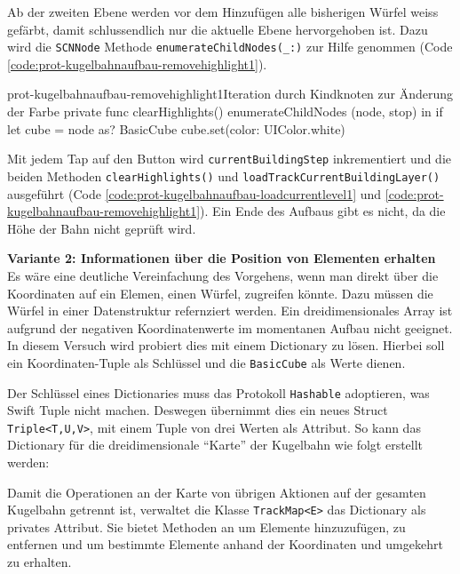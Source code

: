 \begin{description}
	Ab der zweiten Ebene werden vor dem Hinzufügen alle bisherigen Würfel weiss gefärbt, damit schlussendlich nur die aktuelle Ebene hervorgehoben ist. Dazu wird die \texttt{SCNNode} Methode \texttt{enumerateChildNodes(\_:)} zur Hilfe genommen (Code \ref{code:prot-kugelbahnaufbau-removehighlight1}).

	\begin{code}{prot-kugelbahnaufbau-removehighlight1}{Iteration durch Kindknoten zur Änderung der Farbe}
		private func clearHighlights() {
			enumerateChildNodes { (node, stop) in
				if let cube = node as? BasicCube {
					cube.set(color: UIColor.white)
				}
			}
		}
	\end{code}

	Mit jedem Tap auf den Button wird \texttt{currentBuildingStep} inkrementiert und die beiden Methoden \texttt{clearHighlights()} und \texttt{loadTrackCurrentBuildingLayer()} ausgeführt (Code \ref{code:prot-kugelbahnaufbau-loadcurrentlevel1} und \ref{code:prot-kugelbahnaufbau-removehighlight1}). Ein Ende des Aufbaus gibt es nicht, da die Höhe der Bahn nicht geprüft wird.

	\textbf{Variante 2: Informationen über die Position von Elementen erhalten}\\
	Es wäre eine deutliche Vereinfachung des Vorgehens, wenn man direkt über die Koordinaten auf ein Elemen, einen Würfel, zugreifen könnte. Dazu müssen die Würfel in einer Datenstruktur refernziert werden. Ein dreidimensionales Array ist aufgrund der negativen Koordinatenwerte im momentanen Aufbau nicht geeignet. In diesem Versuch wird probiert dies mit einem Dictionary zu lösen. Hierbei soll ein Koordinaten-Tuple als Schlüssel und die \texttt{BasicCube} als Werte dienen.
	
	Der Schlüssel eines Dictionaries muss das Protokoll \texttt{Hashable} adoptieren, was Swift Tuple nicht machen. Deswegen übernimmt dies ein neues Struct \texttt{Triple<T,U,V>}, mit einem Tuple von drei Werten als Attribut. So kann das Dictionary für die dreidimensionale "`Karte"' der Kugelbahn wie folgt erstellt werden:

	Damit die Operationen an der Karte von übrigen Aktionen auf der gesamten Kugelbahn getrennt ist, verwaltet die Klasse \texttt{TrackMap<E>} das Dictionary als privates Attribut. Sie bietet Methoden an um Elemente hinzuzufügen, zu entfernen und um bestimmte Elemente anhand der Koordinaten und umgekehrt zu erhalten.


\end{description}
